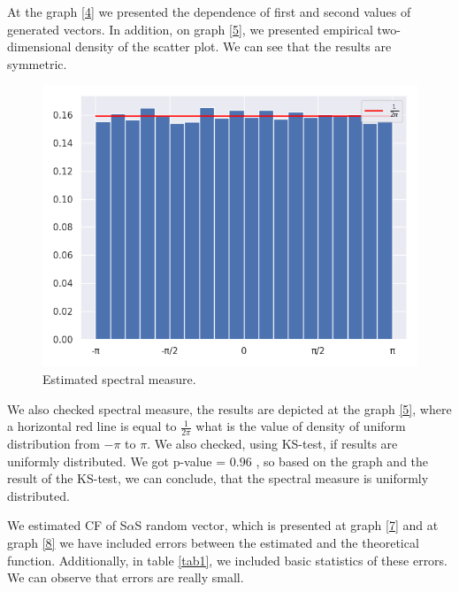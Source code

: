 \documentclass{article}
\begin{document}
	At the graph \ref{4} we presented the dependence of first and second values of generated vectors. In addition, on graph \ref{5}, we presented empirical two-dimensional density of the scatter plot. We can see that the results are symmetric. 
	
	\begin{figure}[H]
		\centering
		\includegraphics[width=0.8\linewidth]{images/ex_2_spectral_measure}
		\caption{Estimated spectral measure.}\label{6}
	\end{figure}
	
	We also checked spectral measure, the results are depicted at the graph \ref{5}, where a horizontal red line is equal to $\frac{1}{2 \pi}$ what is the value of density of uniform distribution from $-\pi$ to $\pi$. 
	We also checked, using KS-test, if results are uniformly distributed. We got p-value = $0.96$ , so based on the graph and the result of the KS-test, we can conclude, that the spectral measure is uniformly distributed.
	
	We estimated CF of S$\alpha$S random vector, which is presented at graph \ref{7} and at graph \ref{8} we have included errors between the estimated and the theoretical function. Additionally, in table \ref{tab1}, we included basic statistics of these errors. We can observe that errors are really small.
	
\end{document}
